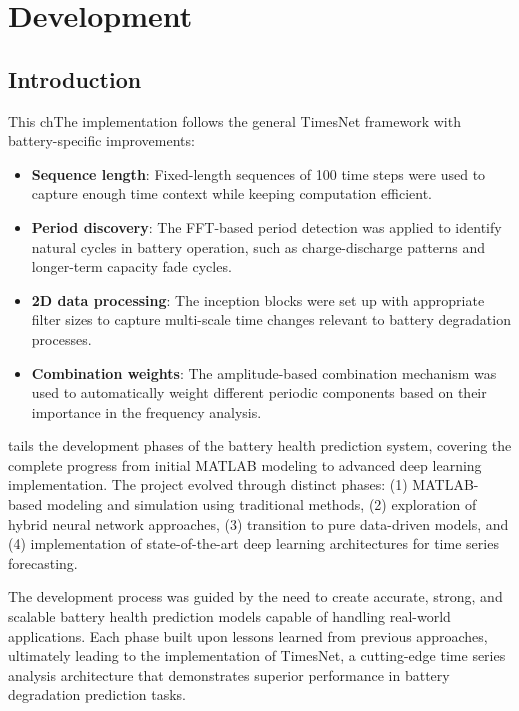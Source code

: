 \chapter{Development}
\label{ch:Development}

\section{Introduction}
\label{sec:dev_introduction}

This chThe implementation follows the general TimesNet framework with battery-specific improvements:

\begin{itemize}
    \item \textbf{Sequence length}: Fixed-length sequences of 100 time steps were used to capture enough time context while keeping computation efficient.
    \item \textbf{Period discovery}: The FFT-based period detection was applied to identify natural cycles in battery operation, such as charge-discharge patterns and longer-term capacity fade cycles.
    \item \textbf{2D data processing}: The inception blocks were set up with appropriate filter sizes to capture multi-scale time changes relevant to battery degradation processes.
    \item \textbf{Combination weights}: The amplitude-based combination mechanism was used to automatically weight different periodic components based on their importance in the frequency analysis.
\end{itemize}tails the development phases of the battery health prediction system, covering the complete progress from initial MATLAB modeling to advanced deep learning implementation. The project evolved through distinct phases: (1) MATLAB-based modeling and simulation using traditional methods, (2) exploration of hybrid neural network approaches, (3) transition to pure data-driven models, and (4) implementation of state-of-the-art deep learning architectures for time series forecasting.

The development process was guided by the need to create accurate, strong, and scalable battery health prediction models capable of handling real-world applications. Each phase built upon lessons learned from previous approaches, ultimately leading to the implementation of TimesNet, a cutting-edge time series analysis architecture that demonstrates superior performance in battery degradation prediction tasks.


